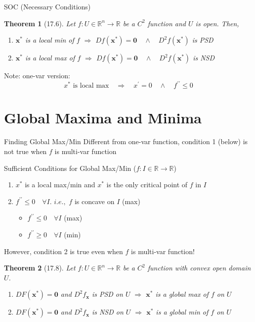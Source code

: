 \documentclass[a4paper,11pt]{article}
\newtheorem{thm}{Theorem}
\newcommand{\bb}{\mathbb}
\newcommand{\bd}{\mathbf}
\begin{document}
\begin{frame}[t]{SOC (Necessary Conditions)}
	\begin{thm}
		[17.6] Let $f:U\in\bb{R}^n\rightarrow\bb{R}$ be a $C^2$ function and $U$ is open. Then,
		\begin{enumerate}
			\item $\bd{x^\ast}$ is a local min of $f$ $\Rightarrow$ $Df(\bd{x^\ast})=\bd{0}\quad\land\quad D^2f(\bd{x^\ast})$ is PSD
			\item $\bd{x^\ast}$ is a local max of $f$ $\Rightarrow$ $Df(\bd{x^\ast})=\bd{0}\quad\land\quad D^2f(\bd{x^\ast})$ is NSD
		\end{enumerate}
	\end{thm}
	Note: one-var version: \[
		x^\ast\text{ is local max} \quad\Rightarrow\quad x^\prime=0\quad\land\quad f^{\prime\prime}\le 0
	\]
\end{frame}

\section{Global Maxima and Minima} %
\label{sec:global_maxima_and_minima}
\begin{frame}[t]{Finding Global Max/Min}
	Different from one-var function, condition 1 (below) is not true when $f$ is multi-var function
	\begin{block}
		{Sufficient Conditions for Global Max/Min ($f:I\in\bb{R}\rightarrow\bb{R}$)}
		\begin{enumerate}
			\item $x^\ast$ is a local max/min and $x^\ast$ is the only critical point of $f$ in $I$
			\item $f^{\prime\prime}\le 0\quad\forall I$. $i.e.,$ $f$ is concave on $I$ (max)
			\begin{itemize}
				\item $f^{\prime\prime}\le 0 \quad \forall I$ (max)
				\item $f^{\prime\prime}\ge 0 \quad \forall I$ (min)
			\end{itemize}
		\end{enumerate}
	\end{block}
	However, condition 2 is true even when $f$ is multi-var function!
	\begin{thm}
		[17.8]
		Let $f:U\in \bb{R}^n\rightarrow \bb{R}$ be a $C^2$ function with convex open domain $U$.
		\begin{enumerate}
			\item $DF(\bd{x^\ast})=\bd{0}$ and $D^2f_{\bd{x}}$ is PSD on $U$ $\Rightarrow $ $\bd{x^\ast}$ is a global max of $f$ on $U$
			\item $DF(\bd{x^\ast})=\bd{0}$ and $D^2f_{\bd{x}}$ is NSD on $U$ $\Rightarrow $ $\bd{x^\ast}$ is a global min of $f$ on $U$
		\end{enumerate}
	\end{thm}
\end{frame}
\end{document}
